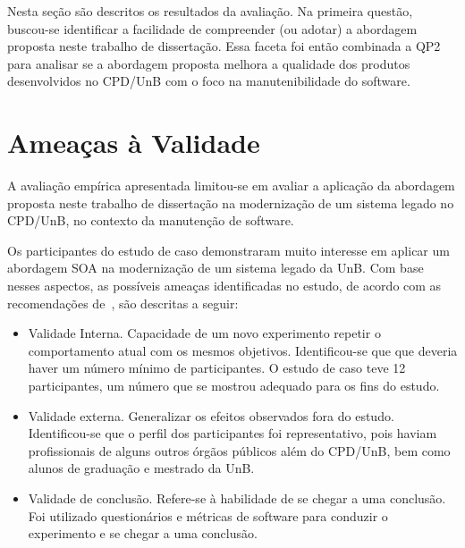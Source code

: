Nesta seção são descritos os resultados da avaliação. Na primeira questão, buscou-se identificar a facilidade de compreender (ou adotar) a abordagem proposta neste trabalho de dissertação. Essa faceta foi então combinada a QP2 para analisar se a abordagem proposta melhora a qualidade dos produtos desenvolvidos no CPD/UnB com o foco na manutenibilidade do software.










\section{Ameaças à Validade}\label{ava:ameacas}

A avaliação empírica apresentada limitou-se em avaliar
a aplicação da abordagem proposta 
neste trabalho de dissertação na
modernização de um sistema legado no CPD/UnB, no
contexto da manutenção de software. 

Os participantes do estudo de caso demonstraram muito
interesse em aplicar um abordagem \acrshort{SOA}
na modernização de um sistema legado da \acrlong{UnB}. Com base 
nesses aspectos,
as possíveis ameaças identificadas no estudo, de acordo com
as recomendações de~\cite{kitchenham:2004}, são descritas a seguir:

\begin{itemize}

	\item Validade Interna. Capacidade de um novo experimento repetir o
comportamento atual com os mesmos objetivos. Identificou-se que que
deveria haver um número mínimo de participantes. O estudo de caso
teve 12 participantes, um número que se mostrou adequado para os fins do estudo.

	\item Validade externa. Generalizar os efeitos observados
fora do estudo. Identificou-se que o perfil dos participantes
foi representativo, pois haviam profissionais de alguns outros
órgãos públicos além do CPD/UnB, bem como alunos de graduação
e mestrado da \acrshort{UnB}.

	\item Validade de conclusão. Refere-se à habilidade de se
chegar a uma conclusão. Foi utilizado questionários e métricas
de software para conduzir o experimento e se chegar a uma conclusão.

\end{itemize}

